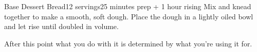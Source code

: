 \documentclass[../Cookbook.tex]{subfiles}
\begin{document}
\begin{recipe}[BaseDessertBread]{Base Dessert Bread}{12 servings}{25 minutes prep + 1 hour rising}
	Mix and knead together to make a smooth, soft dough.
	Place the dough in a lightly oiled bowl and let rise until doubled in volume.

	After this point what you do with it is determined by what you're using it for.
\end{recipe}
\end{document}
